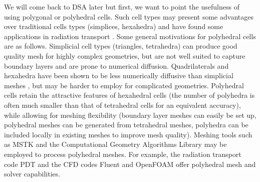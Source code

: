 We will come back to DSA later but first, we want to point the usefulness of
using polygonal or polyhedral cells. Such cell types may present some advantages over
traditional cells types (simplices, hexahedra) and have found some
applications in radiation transport \cite{pwld_2d,pwld_3d,cfm_dfm}. 
Some general motivations for
polyhedral cells are as follows. Simplicial cell types (triangles, tetrahedra)
can produce good  quality mesh for highly complex geometries, but are not
well suited to capture boundary layers and are prone to numerical diffusion.
Quadrilaterals and hexahedra have been shown to be less numerically diffusive
than simplicial meshes \cite{??}, but may be harder to employ for complicated
geometries. Polyhedral cells retain the attractive features of hexahedral
cells  (the number of polyhedra is often much smaller than that of tetrahedral
cells for an equivalent accuracy), while allowing for meshing
flexibility (boundary layer meshes can easily be set up, polyhedral meshes can
be generated from tetrahedral meshes, polyhedra can be included locally in
existing meshes to improve mesh quality). Meshing tools such as MSTK
\cite{mstk} and the Computational Geometry Algorithms Library \cite{cgal} may
be employed to process polyhedral meshes. For example, the radiation transport
code PDT and the CFD codes Fluent and OpenFOAM offer polyhedral mesh and
solver capabilities.

